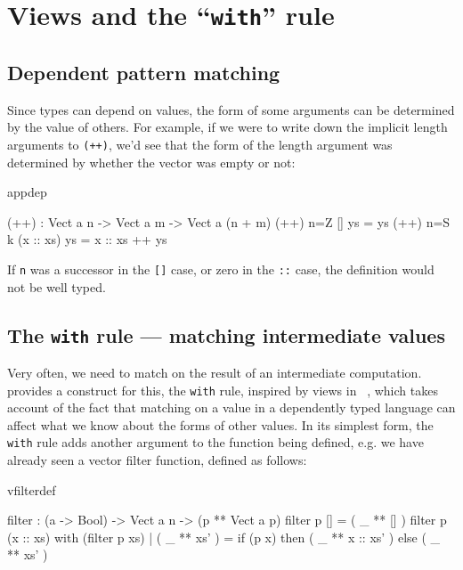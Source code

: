 \section{Views and the ``\texttt{with}'' rule}

\subsection{Dependent pattern matching}

Since types can depend on values, the form of some arguments can be determined
by the value of others. For example, if we were to write down the implicit
length arguments to \texttt{(++)}, we'd see that the form of the length argument was
determined by whether the vector was empty or not:

\begin{SaveVerbatim}{appdep}

(++) : Vect a n -> Vect a m -> Vect a (n + m)
(++) {n=Z}   []        ys = ys
(++) {n=S k} (x :: xs) ys = x :: xs ++ ys

\end{SaveVerbatim}

\noindent
If \texttt{n} was a successor in the \texttt{[]} case, or zero in the 
\texttt{::} case, the definition
would not be well typed.

\subsection{The \texttt{with} rule --- matching intermediate values}

Very often, we need to match on the result of an intermediate computation.
\Idris{} provides a construct for this, the \texttt{with} rule, 
inspired by views in \Epigram~\cite{view-left},
which takes account of the
fact that matching on a value in a dependently typed language can affect what
we know about the forms of other values. In its simplest form, the \texttt{with} rule
adds another argument to the function being defined, e.g. we have already seen
a vector filter function, defined as follows:

\begin{SaveVerbatim}{vfilterdef}

filter : (a -> Bool) -> Vect a n -> (p ** Vect a p)
filter p [] = ( _ ** [] )
filter p (x :: xs) with (filter p xs)
  | ( _ ** xs' ) = if (p x) then ( _ ** x :: xs' ) else ( _ ** xs' )

\end{SaveVerbatim}

